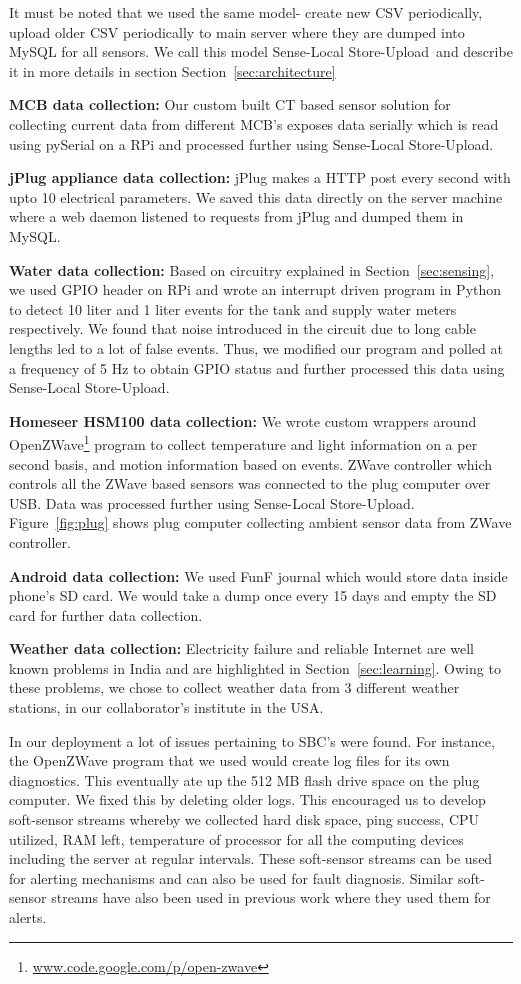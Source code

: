 \documentclass[10pt]{sensys-proc}
\newcommand{\figref}[1]{Figure~\ref{#1}}
\newcommand{\secref}[1]{Section~\ref{#1}}
\newcommand{\paradigm}{Sense-Local Store-Upload}
\newcommand{\paradigms}{Sense-Local Store-Upload~}
\begin{document}
It must be noted that we used the same model- create new CSV periodically, upload older CSV periodically to main server where they are dumped into MySQL for all sensors. We call this model \paradigms and describe it in more details in section \secref{sec:architecture}

\noindent \textbf{MCB data collection:} Our custom built CT based sensor solution for collecting current data from different MCB's exposes data serially which is read using pySerial on a RPi and processed further using \paradigm.

\noindent \textbf{jPlug appliance data collection:} jPlug makes a HTTP post every second with upto 10 electrical parameters. We saved this data directly on the server machine where a web daemon listened to requests from jPlug and dumped them in MySQL.

\noindent \textbf{Water data collection:} Based on circuitry explained in \secref{sec:sensing}, we used GPIO header on RPi and wrote an interrupt driven program in Python to detect 10 liter and 1 liter events for the tank and supply water meters respectively. We found that noise introduced in the circuit due to long cable lengths led to a lot of false events. Thus, we modified our program and polled at a frequency of 5 Hz to obtain GPIO status and further processed this data using \paradigm.	

\noindent \textbf{Homeseer HSM100 data collection:} We wrote custom wrappers around OpenZWave\footnote{\url{www.code.google.com/p/open-zwave}} program to collect temperature and light information on a per second basis, and motion information based on events. ZWave controller which controls all the ZWave based sensors was connected to the plug computer over USB. Data was processed further using \paradigm. \figref{fig:plug} shows plug computer collecting ambient sensor data from ZWave controller.

\noindent \textbf{Android data collection:} We used FunF journal which would store data inside phone's SD card. We would take a dump once every 15 days and empty the SD card for further data collection.

\noindent \textbf{Weather data collection:} Electricity failure  and reliable Internet are well known problems in India and are highlighted in \secref{sec:learning}. Owing to these problems, we chose to collect weather data from 3 different weather stations, in our collaborator's institute in the USA.

In our deployment a lot of issues pertaining to SBC's were found. For instance, the OpenZWave program that we used would create log files for its own diagnostics. This eventually ate up the 512 MB flash drive space on the plug computer. We fixed this by deleting older logs. This encouraged us to develop soft-sensor streams whereby we collected hard disk space, ping success, CPU utilized, RAM left, temperature of processor for all the computing devices including the server at regular intervals. These soft-sensor streams can be used for alerting mechanisms and can also be used for fault diagnosis. Similar soft-sensor streams have also been used in previous work\cite{hitchhiker_residential} where they used them for alerts.
\end{document}
